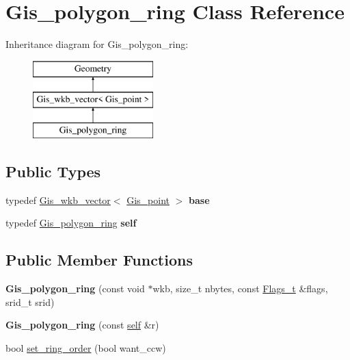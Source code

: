 \hypertarget{classGis__polygon__ring}{}\section{Gis\+\_\+polygon\+\_\+ring Class Reference}
\label{classGis__polygon__ring}
Inheritance diagram for Gis\+\_\+polygon\+\_\+ring\+:\begin{figure}[H]
\begin{center}
\leavevmode
\includegraphics[height=3.000000cm]{classGis__polygon__ring}
\end{center}
\end{figure}
\subsection*{Public Types}
\begin{DoxyCompactItemize}
\item 
\mbox{\label{classGis__polygon__ring_a5a867846c456bd64e34f027411a9dbbe}} 
typedef \mbox{\hyperlink{classGis__wkb__vector}{Gis\+\_\+wkb\+\_\+vector}}$<$ \mbox{\hyperlink{classGis__point}{Gis\+\_\+point}} $>$ {\bfseries base}
\item 
\mbox{\label{classGis__polygon__ring_ab33b24a28cc55d6a32de73fcdee44afd}} 
typedef \mbox{\hyperlink{classGis__polygon__ring}{Gis\+\_\+polygon\+\_\+ring}} {\bfseries self}
\end{DoxyCompactItemize}
\subsection*{Public Member Functions}
\begin{DoxyCompactItemize}
\item 
\mbox{\label{classGis__polygon__ring_ab2eeee31ae584004ee394e68f22e76e3}} 
{\bfseries Gis\+\_\+polygon\+\_\+ring} (const void $\ast$wkb, size\+\_\+t nbytes, const \mbox{\hyperlink{classGeometry_1_1Flags__t}{Flags\+\_\+t}} \&flags, srid\+\_\+t srid)
\item 
\mbox{\label{classGis__polygon__ring_acbb357005ab332b7cada27f97a82f821}} 
{\bfseries Gis\+\_\+polygon\+\_\+ring} (const \mbox{\hyperlink{classGis__polygon__ring}{self}} \&r)
\item 
bool \mbox{\hyperlink{classGis__polygon__ring_a2807ddb3d4e769048a73c115416f5bd8}{set\+\_\+ring\+\_\+order}} (bool want\+\_\+ccw)
\end{DoxyCompactItemize}
